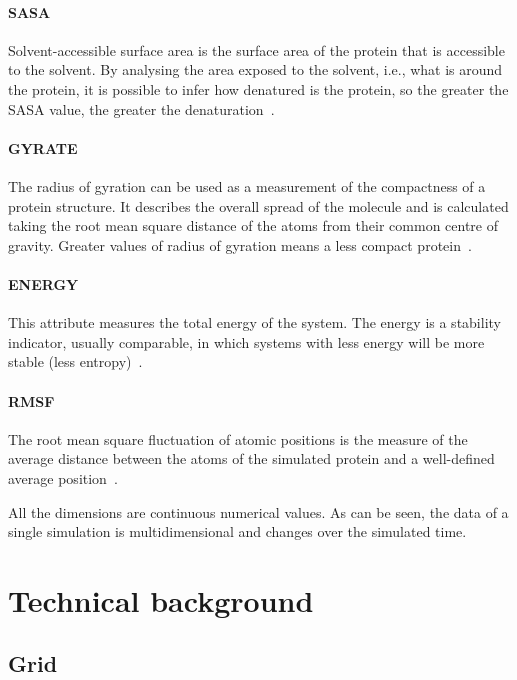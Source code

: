 \documentclass[10pt, conference]{IEEEtran}
\begin{document}
\paragraph*{SASA} Solvent-accessible surface area is the surface area of the protein that is accessible to the solvent. By analysing the area exposed to the solvent, i.e., what is around the protein, it is possible to infer how denatured is the protein, so the greater the SASA value, the greater the denaturation~\cite{richmond1984solvent}.
%

\paragraph*{GYRATE} The radius of gyration can be used as a measurement of the compactness of a protein structure. It describes the overall spread of the molecule and is calculated taking the root mean square distance of the atoms from their common centre of gravity. Greater values of radius of gyration means a less compact protein~\cite{lobanov2008radius}.
%

\paragraph*{ENERGY} This attribute measures the total energy of the system. The energy is a stability indicator, usually comparable, in which systems with less energy will be more stable (less entropy)~\cite{van1998gromos}.
%

\paragraph*{RMSF} The root mean square fluctuation of atomic positions is the measure of the average distance between the atoms of the simulated protein and a well-defined average position~\cite{maiorov1994significance}. 
%

All the dimensions are continuous numerical values. As can be seen, the data of a single simulation is multidimensional and changes over the simulated time.

\section{Technical background}
%

\subsection{Grid}
\end{document}
